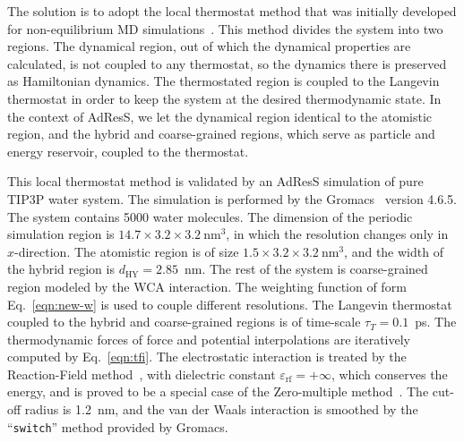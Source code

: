 \documentclass[epjST]{svjour}
\newcommand{\HY}[0]{\textrm{HY}}
\begin{document}
The solution is to adopt the local thermostat method that was initially
developed for non-equilibrium MD simulations~\cite{wang2014exploring}.
This method divides the system into two regions.
The dynamical region, out of which the dynamical properties are calculated, is not coupled
to any thermostat, so the dynamics there is preserved as Hamiltonian dynamics.
The thermostated region is coupled to the Langevin thermostat in order to keep the system
at the desired thermodynamic state.
In the context of AdResS, we let the dynamical region identical to the atomistic region,
and
the hybrid and coarse-grained regions, which serve as particle and energy reservoir, coupled to the thermostat.

This local thermostat method is validated by an AdResS simulation of pure TIP3P
water system.
The simulation is performed by the Gromacs~\cite{pronk2013gromacs} version 4.6.5.
The system contains 5000 water molecules.  The dimension of the periodic
simulation region is $14.7\times3.2\times3.2~\textrm{nm}^3$,
in which the resolution changes only in $x$-direction.
The atomistic region is of size $1.5\times3.2\times3.2~\textrm{nm}^3$, and the width of the hybrid region is $d_{\HY} = 2.85$~nm.
The rest of the system is coarse-grained region modeled by the WCA interaction.
The weighting function of form Eq.~\eqref{eqn:new-w} is used to couple different resolutions.
The Langevin thermostat coupled to the hybrid and coarse-grained regions is of time-scale $\tau_T = 0.1$~ps.
The thermodynamic forces of force and potential interpolations are iteratively computed by
Eq.~\eqref{eqn:tfi}.
The electrostatic interaction is treated by the Reaction-Field method~\cite{onsager1936electric,tironi1995generalized},
with dielectric constant $\varepsilon_{\textrm{rf}} = +\infty$, which conserves the energy, and
is proved to be a special case of the  Zero-multiple method~\cite{fukuda2011molecular,fukuda2013zero}.
The cut-off radius is 1.2~nm, and the van der Waals interaction is smoothed by the ``\texttt{switch}'' method provided by
Gromacs.
\end{document}
